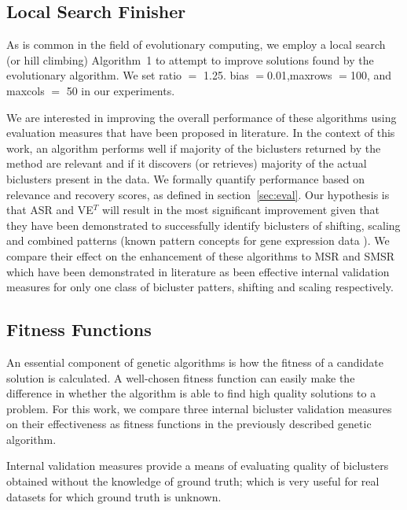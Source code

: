 \subsection{Local Search Finisher}
As is common in the field of evolutionary computing, we employ a local search (or hill climbing) Algorithm~1 to attempt to improve solutions found by the evolutionary algorithm. We set ratio $=$ 1.25. bias $=$0.01,maxrows $=$100, and maxcols $=$ 50 in our experiments.


We are interested in improving the overall performance of these algorithms using evaluation measures that have been proposed in literature.
In the context of this work, an algorithm performs well if majority of the biclusters returned by the method are relevant and if it discovers (or retrieves) majority of the actual biclusters present in the data.
We formally quantify performance based on relevance and recovery scores, as defined in section~\ref{sec:eval}.
Our hypothesis is that ASR and VE$^T$ will result in the most significant improvement given that they have been demonstrated to successfully identify biclusters of shifting, scaling and combined patterns (known pattern concepts for gene expression data \cite{pontes2010measuring}).
We compare their effect on the enhancement of these algorithms to MSR and SMSR which have been demonstrated in literature as been effective internal validation measures for only one class of bicluster patters, shifting and scaling respectively.

\subsection{Fitness Functions}
An essential component of genetic algorithms is how the fitness of a candidate solution is calculated. A well-chosen fitness function can easily make the difference in whether the algorithm is able to find high quality solutions to a problem. For this work, we compare three internal bicluster validation measures on their effectiveness as fitness functions in the previously described genetic algorithm.

Internal validation measures provide a means of evaluating quality of biclusters obtained without the knowledge of ground truth; which is very useful for real datasets for which ground truth is unknown. 

